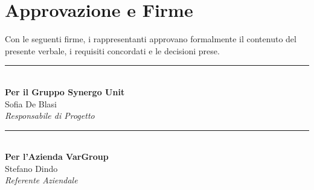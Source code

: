 \newpage
\section*{Approvazione e Firme}
Con le seguenti firme, i rappresentanti approvano formalmente il contenuto del presente verbale, i requisiti concordati e le decisioni prese.

\vspace{2.5cm}

\noindent
\begin{minipage}[c]{0.45\textwidth}
	\begin{center}
		\rule{6cm}{0.4pt} \\ 
		\vspace{0.2cm}
		\textbf{Per il Gruppo Synergo Unit} \\
		{Sofia De Blasi} \\
		\textit{Responsabile di Progetto}
	\end{center}
\end{minipage}
\hfill
\begin{minipage}[c]{0.45\textwidth}
	\begin{center}
		\rule{6cm}{0.4pt} \\ 
		\vspace{0.2cm}
		\textbf{Per l'Azienda {VarGroup}} \\
		{Stefano Dindo} \\
		\textit{Referente Aziendale}
	\end{center}
\end{minipage}